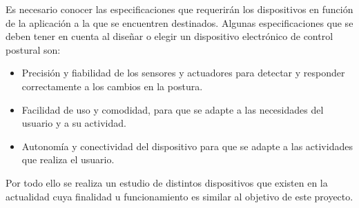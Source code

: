 Es necesario conocer las especificaciones que requerirán los dispositivos en función de la aplicación a la que se encuentren destinados. Algunas especificaciones que se deben tener en cuenta al diseñar o elegir un dispositivo electrónico de control postural son: 
\begin{itemize}
    \item Precisión y fiabilidad de los sensores y actuadores para detectar y responder correctamente a los cambios en la postura. 

    \item Facilidad de uso y comodidad, para que se adapte a las necesidades del usuario y a su actividad. 

    \item Autonomía y conectividad del dispositivo para que se adapte a las actividades que realiza el usuario. 
\end{itemize}

Por todo ello se realiza un estudio de distintos dispositivos que existen en la actualidad cuya finalidad u funcionamiento es similar al objetivo de este proyecto. 

